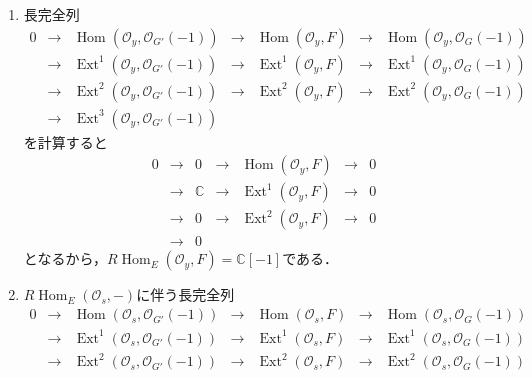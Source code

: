 \documentclass[uplatex,a4paper,11pt,dvipdfmx]{jsarticle}
\makeatletter
\theoremstyle{mystyle} %
\renewenvironment{proof}[1][\proofname]{\par
 \pushQED{\qed}%
 \normalfont \topsep6\p@\@plus6\p@\relax
 \trivlist
 \item[\hskip\labelsep
 \itshape
 {\bf\underline{#1}}]\ignorespaces
}{%
 \popQED\endtrivlist\@endpefalse
}
\DeclareMathOperator{\Hom}{Hom}
\DeclareMathOperator{\Ext}{Ext}
\makeatother
\begin{document}
\begin{proof}
\begin {enumerate}
\[\begin{array}{ccccccc}
			0 & \to & 0 & \to & \Hom(\mathcal{O}_x, F)   & \to & 0          \\
			  & \to & 0 & \to & \Ext^1(\mathcal{O}_x, F) & \to & \mathbb{C} \\
			  & \to & 0 & \to & \Ext^2(\mathcal{O}_x,F)  & \to & 0          \\
			  & \to & 0 &     &                          &     &
		\end{array}
	\]となるから，$R\Hom_E(\mathcal{O}_x, F) = \mathbb{C}[-1]$である．
	\item 長完全列\[
		\begin{array}{ccccccc}
			0 & \to & \Hom(\mathcal{O}_y, \mathcal{O}_{G'}(-1))    & \to & \Hom(\mathcal{O}_y, F)   & \to & \Hom(\mathcal{O}_y, \mathcal{O}_G(-1))   \\
			  & \to & \Ext^1(\mathcal{O}_y, \mathcal{O}_{G'}(-1))  & \to & \Ext^1(\mathcal{O}_y, F) & \to & \Ext^1(\mathcal{O}_y, \mathcal{O}_G(-1)) \\
			  & \to & \Ext^2(\mathcal{O}_y, \mathcal{O}_{G'}(-1))  & \to & \Ext^2(\mathcal{O}_y,F)  & \to & \Ext^2(\mathcal{O}_y, \mathcal{O}_G(-1)) \\
			  & \to & \Ext^3(\mathcal{O}_y, \mathcal{O}_{G'}(-1) ) &     &                          &     &
		\end{array}
	\]を計算すると\[
		\begin{array}{ccccccc}
			0 & \to & 0          & \to & \Hom(\mathcal{O}_y, F)   & \to & 0 \\
			  & \to & \mathbb{C} & \to & \Ext^1(\mathcal{O}_y, F) & \to & 0 \\
			  & \to & 0          & \to & \Ext^2(\mathcal{O}_y,F)  & \to & 0 \\
			  & \to & 0          &     &                          &     &
		\end{array}
	\]となるから，$R\Hom_E(\mathcal{O}_y, F) = \mathbb{C}[-1]$である．
	\item $R\Hom_E(\mathcal{O}_s, -)$に伴う長完全列\[
		\begin{array}{ccccccc}
			0 & \to & \Hom(\mathcal{O}_s, \mathcal{O}_{G'}(-1))    & \to & \Hom(\mathcal{O}_s, F)   & \to & \Hom(\mathcal{O}_s, \mathcal{O}_G(-1))   \\
			  & \to & \Ext^1(\mathcal{O}_s, \mathcal{O}_{G'}(-1))  & \to & \Ext^1(\mathcal{O}_s, F) & \to & \Ext^1(\mathcal{O}_s, \mathcal{O}_G(-1)) \\
			  & \to & \Ext^2(\mathcal{O}_s, \mathcal{O}_{G'}(-1))  & \to & \Ext^2(\mathcal{O}_s,F)  & \to & \Ext^2(\mathcal{O}_s, \mathcal{O}_G(-1)) \\

\end{array}\]
\end{enumerate}
\end{proof}
\end{document}
